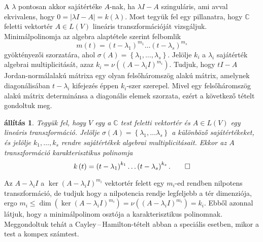 \documentclass[9pt, a4paper, showtrims]{memoir}
\makeatletter
\renewenvironment{proof}[1][\proofname]
    {\par\pushQED{\qed}%
    \normalfont \topsep6\p@\@plus6\p@\relax
    \trivlist
    \item[\hskip\labelsep
        \itshape
    #1\@addpunct{:}]\ignorespaces}
    {\popQED\endtrivlist\@endpefalse}
\theoremstyle{plain}
\newtheorem{proposition}{állítás}[chapter]
\theoremstyle{remark}
\theoremstyle{definition}
\makeatother
\begin{document}
\begin{proof}
	A $\lambda$ pontosan akkor sajátértéke $A$-nak,
	ha $\lambda I-A$ szinguláris,
	ami avval ekvivalens, hogy $0=|\lambda I-A|=k\left( \lambda \right)$.
\end{proof}
Most tegyük fel egy pillanatra, hogy $\mathbb{C}$ feletti vektortér $A\in L(V)$ lineáris transzformációját
vizsgáljuk. Minimálpolinomja az algebra alaptétele szerint felbomlik
\[
	m\left( t \right)
	=\left( t-\lambda_1 \right)^{m_1}\dots\left( t-\lambda_s \right)^{m_s}
\]
gyöktényezői szorzatára, ahol $\sigma\left( A \right)=\left\{ \lambda_1,\ldots,\lambda_s\right\}$.
Jelölje $k_i$ a $\lambda_i$ sajátérték algebrai multiplicitását,
azaz $k_i=\nu\left( \left( A-\lambda_i I \right)^{m_i} \right)$.
Tudjuk, hogy $tI-A$ Jordan-normálalakú
mátrixa egy olyan felsőháromszög alakú mátrix,
amelynek diagonálisában $t-\lambda_i$ kifejezés éppen $k_i$-szer szerepel.
Mivel egy felsőháromszög alakú mátrix determinánsa a diagonális elemek szorzata,
ezért a következő tételt gondoltuk meg.
\begin{proposition}
	Tegyük fel, hogy $V$ egy a $\mathbb{C}$ test feletti vektortér és $A\in L\left( V \right)$
	egy lineáris transzformáció.
	Jelölje $\sigma\left( A \right)=\left\{\lambda_1,\dots\lambda_s  \right\}$ a különböző sajátértékeket,
	és jelölje $k_1,\ldots,k_s$ rendre sajátértékek algebrai multiplicitásait.
	Ekkor az $A$ transzformáció karakterisztikus polinomja
	\[
		k\left( t \right)
		=
		\left( t-\lambda_1 \right)^{k_1}\dots\left( t-\lambda_s \right)^{k_s}.\qedhere
	\]
\end{proposition}
Az $A-\lambda_iI$ a $\ker\left( A-\lambda_iI \right)^{m_i}$ vektortér felett egy $m_i$-ed rendben nilpotens transzformáció,
de tudjuk hogy a nilpotencia rendje legfeljebb a tér dimenziója,
ergo
$m_i\leq\dim\left( \ker\left( A-\lambda_iI \right)^{m_i} \right)
	=
	\nu\left( \left( A-\lambda_iI \right)^{m_i} \right)=k_i$.
Ebből azonnal látjuk, hogy a minimálpolinom osztója a karakterisztikus polinomnak.
Meggondoltuk tehát a Cayley\,--\,Hamilton-tételt abban a speciális esetben,
mikor a test a kompex számtest.
\end{document}
